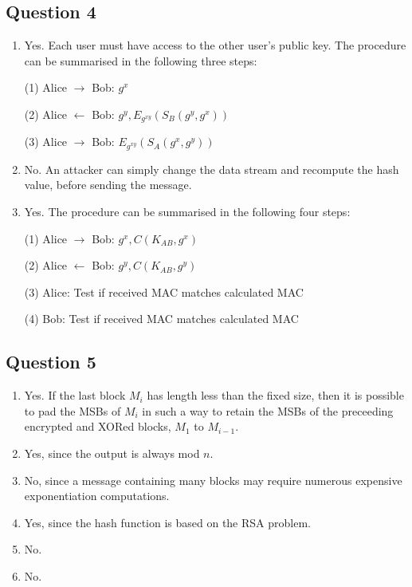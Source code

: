 \documentclass[12pt]{article}
\begin{document}
\subsection*{Question 4}
\begin{enumerate}
\item Yes. Each user must have access to the other user's public key. The procedure can be summarised in the following three steps:
\begin{center}
(1) Alice $\rightarrow$ Bob: $g^{x}$

(2) Alice $\leftarrow$ Bob: $g^{y}, E_{g^{xy}}(S_{B}(g^{y}, g^{x}))$

(3) Alice $\rightarrow$ Bob: $E_{g^{xy}}(S_{A}(g^{x}, g^{y}))$
\end{center}

\item No. An attacker can simply change the data stream and recompute the hash value, before sending the message.

\item Yes. The procedure can be summarised in the following four steps:
\begin{center}
(1) Alice $\rightarrow$ Bob: $g^{x}, C(K_{AB}, g^{x})$

(2) Alice $\leftarrow$ Bob: $g^{y}, C(K_{AB}, g^{y})$

(3) Alice: Test if received MAC matches calculated MAC

(4) Bob: Test if received MAC matches calculated MAC
\end{center}
\end{enumerate}


\subsection*{Question 5}
\begin{enumerate}
\item Yes. If the last block $M_{i}$ has length less than the fixed size, then it is possible to
pad the MSBs of $M_{i}$ in such a way to retain the MSBs of the preceeding encrypted 
and XORed blocks, $M_{1}$ to $M_{i-1}$.

\item Yes, since the output is always mod $n$.

\item No, since a message containing many blocks may require numerous expensive exponentiation computations.

\item Yes, since the hash function is based on the RSA problem.

\item No.

\item No.
\end{enumerate}
\end{document}
